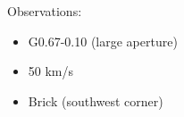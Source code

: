 Observations:
\begin{itemize}
\item G0.67-0.10 (large aperture)
\item 50 km/s 
\item Brick (southwest corner)
\end{itemize}

